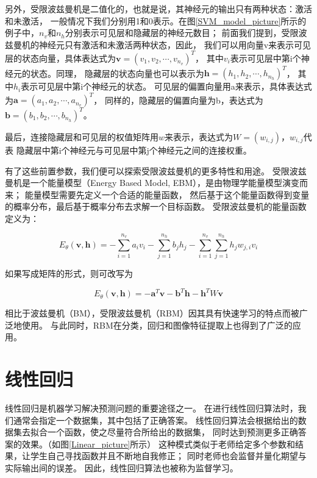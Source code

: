 另外，受限波兹曼机是二值化的，也就是说，其神经元的输出只有两种状态：激活和未激活，
一般情况下我们分别用1和0表示。在图\ref{SVM_model_picture}所示的例子中，$n_v$和$n_h$分别表示可见层和隐藏层的神经元数目；
前面我们提到，受限波兹曼机的神经元只有激活和未激活两种状态，因此，
我们可以用向量v来表示可见层的状态向量，具体表达式为$\mathbf{v}=\left(v_{1}, v_{2}, \cdots, v_{n_{v}}\right)^{T}$，
其中$v_i$表示可见层中第i个神经元的状态。同理，
隐藏层的状态向量也可以表示为$\mathbf{h}=\left(h_{1}, h_{2}, \cdots, h_{n_{h}}\right)^{T}$，
其中$h_i$表示可见层中第i个神经元的状态。
可见层的偏置向量用a来表示，具体表达式为$\mathbf{a}=\left(a_{1}, a_{2}, \cdots, a_{n_{v}}\right)^{T}$，
同样的，隐藏层的偏置向量为b，表达式为$\mathbf{b}=\left(b_{1}, b_{2}, \cdots, b_{n_{h}}\right)^{T}$。


最后，连接隐藏层和可见层的权值矩阵用$w$来表示，表达式为$W=\left(w_{i, j}\right)$，$w_{i,j}$代表
隐藏层中第i个神经元与可见层中第j个神经元之间的连接权重。


有了这些前置参数，我们便可以探索受限波兹曼机的更多特性和用途。
受限波兹曼机是一个能量模型（Energy Based Model, EBM），是由物理学能量模型演变而来；
能量模型需要先定义一个合适的能量函数，
然后基于这个能量函数得到变量的概率分布，最后基于概率分布去求解一个目标函数。
受限波兹曼机的能量函数定义为：

\begin{equation}
E_{\theta}(\mathbf{v}, \mathbf{h})=-\sum_{i=1}^{n_{v}} a_{i} v_{i}-\sum_{j=1}^{n_{h}} b_{j} h_{j}-\sum_{i=1}^{n_{v}} \sum_{j=1}^{n_{h}} h_{j} w_{j, i} v_{i}
\end{equation}


如果写成矩阵的形式，则可改写为

\begin{equation}
E_{\theta}(\mathbf{v}, \mathbf{h})=-\mathbf{a}^{T} \mathbf{v}-\mathbf{b}^{T} \mathbf{h}-\mathbf{h}^{T} W \mathbf{v}
\end{equation}

相比于波兹曼机（BM），受限波兹曼机（RBM）因其具有快速学习的特点而被广泛地使用。
与此同时，RBM在分类，回归和图像特征提取上也得到了广泛的应用。



\section{线性回归}
线性回归是机器学习解决预测问题的重要途径之一。
在进行线性回归算法时，我们通常会指定一个数据集，其中包括了正确答案。
线性回归算法会根据给出的数据集去拟合一个函数，使之尽量符合所给出的数据集，
同时达到预测更多正确答案的效果。（如图\ref{Linear_picture}所示）
这种模式类似于老师给定多个参数和结果，让学生自己寻找函数并且不断地自我修正；
同时老师也会监督并量化期望与实际输出间的误差。
因此，线性回归算法也被称为监督学习。

